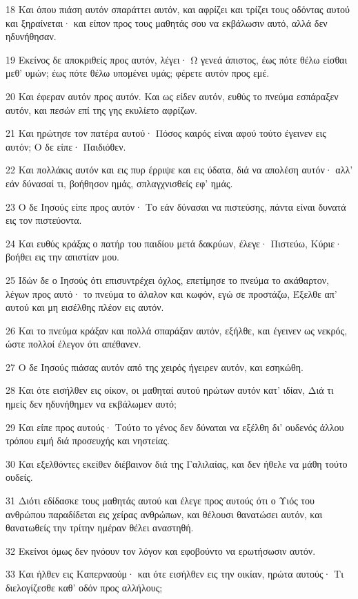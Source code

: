 \par 18 Και όπου πιάση αυτόν σπαράττει αυτόν, και αφρίζει και τρίζει τους οδόντας αυτού και ξηραίνεται· και είπον προς τους μαθητάς σου να εκβάλωσιν αυτό, αλλά δεν ηδυνήθησαν.
\par 19 Εκείνος δε αποκριθείς προς αυτόν, λέγει· Ω γενεά άπιστος, έως πότε θέλω είσθαι μεθ' υμών; έως πότε θέλω υπομένει υμάς; φέρετε αυτόν προς εμέ.
\par 20 Και έφεραν αυτόν προς αυτόν. Και ως είδεν αυτόν, ευθύς το πνεύμα εσπάραξεν αυτόν, και πεσών επί της γης εκυλίετο αφρίζων.
\par 21 Και ηρώτησε τον πατέρα αυτού· Πόσος καιρός είναι αφού τούτο έγεινεν εις αυτόν; Ο δε είπε· Παιδιόθεν.
\par 22 Και πολλάκις αυτόν και εις πυρ έρριψε και εις ύδατα, διά να απολέση αυτόν· αλλ' εάν δύνασαί τι, βοήθησον ημάς, σπλαγχνισθείς εφ' ημάς.
\par 23 Ο δε Ιησούς είπε προς αυτόν· Το εάν δύνασαι να πιστεύσης, πάντα είναι δυνατά εις τον πιστεύοντα.
\par 24 Και ευθύς κράξας ο πατήρ του παιδίου μετά δακρύων, έλεγε· Πιστεύω, Κύριε· βοήθει εις την απιστίαν μου.
\par 25 Ιδών δε ο Ιησούς ότι επισυντρέχει όχλος, επετίμησε το πνεύμα το ακάθαρτον, λέγων προς αυτό· το πνεύμα το άλαλον και κωφόν, εγώ σε προστάζω, Έξελθε απ' αυτού και μη εισέλθης πλέον εις αυτόν.
\par 26 Και το πνεύμα κράξαν και πολλά σπαράξαν αυτόν, εξήλθε, και έγεινεν ως νεκρός, ώστε πολλοί έλεγον ότι απέθανεν.
\par 27 Ο δε Ιησούς πιάσας αυτόν από της χειρός ήγειρεν αυτόν, και εσηκώθη.
\par 28 Και ότε εισήλθεν εις οίκον, οι μαθηταί αυτού ηρώτων αυτόν κατ' ιδίαν, Διά τι ημείς δεν ηδυνήθημεν να εκβάλωμεν αυτό;
\par 29 Και είπε προς αυτούς· Τούτο το γένος δεν δύναται να εξέλθη δι' ουδενός άλλου τρόπου ειμή διά προσευχής και νηστείας.
\par 30 Και εξελθόντες εκείθεν διέβαινον διά της Γαλιλαίας, και δεν ήθελε να μάθη τούτο ουδείς.
\par 31 Διότι εδίδασκε τους μαθητάς αυτού και έλεγε προς αυτούς ότι ο Υιός του ανθρώπου παραδίδεται εις χείρας ανθρώπων, και θέλουσι θανατώσει αυτόν, και θανατωθείς την τρίτην ημέραν θέλει αναστηθή.
\par 32 Εκείνοι όμως δεν ηνόουν τον λόγον και εφοβούντο να ερωτήσωσιν αυτόν.
\par 33 Και ήλθεν εις Καπερναούμ· και ότε εισήλθεν εις την οικίαν, ηρώτα αυτούς· Τι διελογίζεσθε καθ' οδόν προς αλλήλους;
